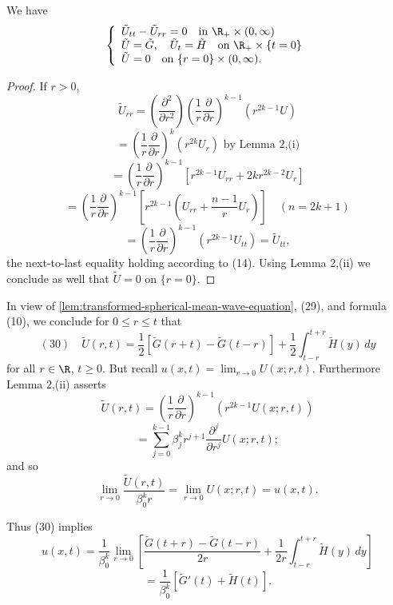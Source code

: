 \begin{lemma}
\label{lem:transformed-spherical-mean-wave-equation}
We have
$$\left\{\begin{array}{l}
\tilde{U}_{tt} - \tilde{U}_{rr} = 0 \quad \text{in } \R_+ \times (0, \infty) \\
\tilde{U} = \tilde{G}, \quad \tilde{U}_t = \tilde{H} \quad \text{on } \R_+ \times \{t = 0\} \\
\tilde{U} = 0 \quad \text{on } \{r = 0\} \times (0, \infty).
\end{array}\right.$$
\end{lemma}

\begin{proof}
If $r > 0$,
$$\tilde{U}_{rr} = \left(\frac{\partial^2}{\partial r^2}\right) \left(\frac{1}{r}\frac{\partial}{\partial r}\right)^{k-1} (r^{2k-1}U)$$
$$= \left(\frac{1}{r}\frac{\partial}{\partial r}\right)^k (r^{2k}U_r) \text{ by Lemma 2,(i)}$$
$$= \left(\frac{1}{r}\frac{\partial}{\partial r}\right)^{k-1} [r^{2k-1}U_{rr} + 2kr^{2k-2}U_r]$$
$$= \left(\frac{1}{r}\frac{\partial}{\partial r}\right)^{k-1} \left[r^{2k-1}\left(U_{rr} + \frac{n-1}{r}U_r\right)\right] \quad (n = 2k+1)$$
$$= \left(\frac{1}{r}\frac{\partial}{\partial r}\right)^{k-1} (r^{2k-1}U_{tt}) = \tilde{U}_{tt},$$
the next-to-last equality holding according to (14). Using Lemma 2,(ii) we conclude as well that $\tilde{U} = 0$ on $\{r = 0\}$.
\end{proof}

In view of \cref{lem:transformed-spherical-mean-wave-equation}, (29), and formula (10), we conclude for $0 \leq r \leq t$ that
$$(30) \quad \tilde{U}(r,t) = \frac{1}{2}[\tilde{G}(r+t) - \tilde{G}(t-r)] + \frac{1}{2}\int_{t-r}^{t+r} \tilde{H}(y) \, dy$$
for all $r \in \R$, $t \geq 0$. But recall $u(x,t) = \lim_{r \to 0} U(x; r, t)$. Furthermore Lemma 2,(ii) asserts
$$\tilde{U}(r,t) = \left(\frac{1}{r}\frac{\partial}{\partial r}\right)^{k-1} (r^{2k-1}U(x; r, t))$$
$$= \sum_{j=0}^{k-1} \beta_j^k r^{j+1} \frac{\partial^j}{\partial r^j} U(x; r, t);$$
and so
$$\lim_{r \to 0} \frac{\tilde{U}(r,t)}{\beta_0^k r} = \lim_{r \to 0} U(x; r, t) = u(x,t).$$

Thus (30) implies
$$u(x,t) = \frac{1}{\beta_0^k} \lim_{r \to 0} \left[\frac{\tilde{G}(t+r) - \tilde{G}(t-r)}{2r} + \frac{1}{2r}\int_{t-r}^{t+r} \tilde{H}(y) \, dy\right]$$
$$= \frac{1}{\beta_0^k} [\tilde{G}'(t) + \tilde{H}(t)].$$

